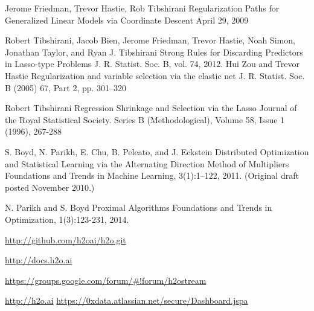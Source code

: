 \documentclass[11pt]{article}
\begin{document}
\begin{thebibliography}{9}

Jerome Friedman, Trevor Hastie, Rob Tibshirani
Regularization Paths for Generalized Linear Models via Coordinate Descent
April 29, 2009

  Robert Tibshirani, Jacob Bien, Jerome Friedman, Trevor Hastie, Noah Simon, Jonathan Taylor, and Ryan J. Tibshirani
  Strong Rules for Discarding Predictors in Lasso-type Problems
  J. R. Statist. Soc. B, vol. 74, 
  2012.
Hui Zou and Trevor Hastie
Regularization and variable selection via the elastic net
J. R. Statist. Soc. B (2005) 67, Part 2, pp. 301–320

Robert Tibshirani
Regression Shrinkage and Selection via the Lasso
Journal of the Royal Statistical Society. Series B (Methodological), Volume 58, Issue 1 (1996), 267-288

S. Boyd, N. Parikh, E. Chu, B. Peleato, and J. Eckstein
Distributed Optimization and Statistical Learning via the Alternating Direction Method of Multipliers
Foundations and Trends in Machine Learning, 3(1):1–122, 2011. (Original draft posted November 2010.)

N. Parikh and S. Boyd
Proximal Algorithms
Foundations and Trends in Optimization, 1(3):123-231, 2014.

\url{http://github.com/h2oai/h2o.git}

\url{http://docs.h2o.ai}

\url{https://groups.google.com/forum/#!forum/h2ostream}

\url{http://h2o.ai}
\url{https://0xdata.atlassian.net/secure/Dashboard.jspa}
\end{thebibliography}

\end{document}
